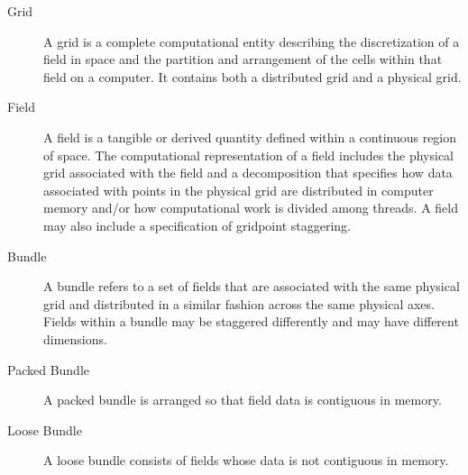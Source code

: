 
\begin{description}

\item [Grid] \label{glos:grid} A grid is a complete computational entity
describing the discretization of a field in space and the partition 
and arrangement of the cells within that field on a computer.
It contains both a distributed grid and a physical grid.

\item [Field] \label{glos:fld} A field is a tangible or derived quantity
defined within a continuous region of space.  The computational representation 
of a field includes the physical grid associated with the field and a 
decomposition that specifies how data associated with points in the 
physical grid are distributed in computer memory and/or how computational 
work is divided among threads.  A field may also include a specification 
of gridpoint staggering.

\item [Bundle] \label{glos:bundle} A bundle refers to a set of fields that 
are associated with the same physical grid and distributed in a similar 
fashion across the same physical axes.  Fields within a bundle may be
staggered differently and may have different dimensions.

\item [Packed Bundle] \label{glos:packedbundle} A packed bundle is arranged
so that field data is contiguous in memory.

\item [Loose Bundle] \label{glos:loosebundle} A loose bundle consists of 
fields whose data is not contiguous in memory.

\end{description}















